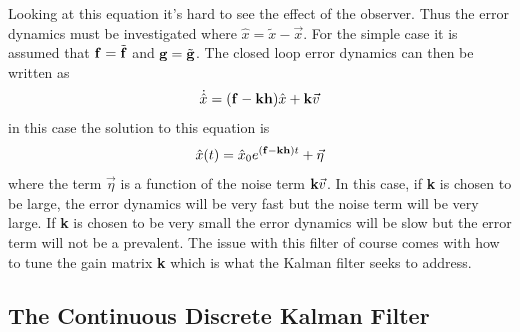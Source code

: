 Looking at this equation it's hard to see the effect of the
observer. Thus the error dynamics must be investigated where
$\hat{x}=\tilde{x}-\vec{x}$. For the simple case it is assumed that
${\bf f}=\tilde{{\bf f}}$ and ${\bf g}=\tilde{{\bf g}}$. The closed
loop error dynamics can then be written as
\begin{equation}
  \dot{\hat{x}} = ({\bf f} - {\bf k}{\bf h})\hat{x} + {\bf k}\vec{v}
\end{equation}
in this case the solution to this equation is
\begin{equation}
  \hat{x}(t) = \hat{x}_0e^{({\bf f} - {\bf k}{\bf h})t} + \vec{\eta}
\end{equation}
where the term $\vec{\eta}$ is a function of the noise term ${\bf
  k}\vec{v}$. In this case, if {\bf k} is chosen to be large, the
error dynamics will be very fast but the noise term will be very
large. If {\bf k} is chosen to be very small the error dynamics will
be slow but the error term will not be a prevalent. The issue with
this filter of course comes with how to tune the gain matrix {\bf k}
which is what the Kalman filter seeks to address.
    
\subsection{The Continuous Discrete Kalman Filter}

